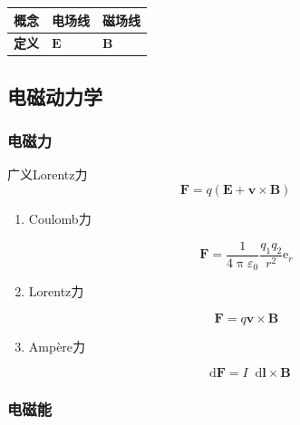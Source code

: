 \documentclass[UTF8,fontset=fandol,zihao=5]{ctexart}
\newcommand{\ee}{\mathrm{e}}
\newcommand{\vect}[1]{\bm{#1}}
\newcommand{\dif}{\mathop{}\!\mathrm{d}}
\begin{document}
\begin{center}
\begin{tabularx}{0.98\textwidth}{>{\bfseries}p{1.5cm}X X}
\toprule
概念 & 电场线 & 磁场线 \\
\midrule
定义 & \(\vect E\) & \(\vect B\) \\
\bottomrule
\end{tabularx}
\end{center}

\subsection{电磁动力学}

\subsubsection{电磁力}

广义Lorentz力
\[
\vect F=q(\vect E+\vect v\times\vect B)
\]

\begin{enumerate}
  \item Coulomb力
  
  \[
  \vect F = \frac{1}{4\uppi\varepsilon_0}\frac{q_1q_2}{r^2}\vect \ee_r
  \]
  
  \item Lorentz力
  
  \[
  \vect F = q\vect v\times\vect B
  \]

  \item Ampère力
  
  \[
  \dif \vect F = I \dif \vect l \times \vect B
  \]

\end{enumerate}

\subsubsection{电磁能}
\end{document}
